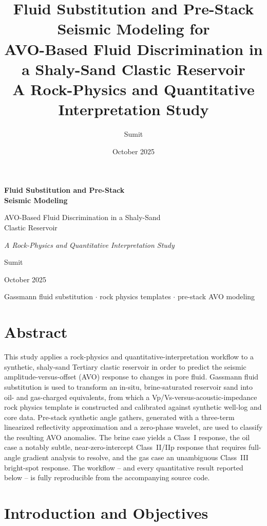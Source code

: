 \documentclass[11pt]{article}
\title{\Large\textbf{Fluid Substitution and Pre-Stack Seismic Modeling for\\
AVO-Based Fluid Discrimination in a Shaly-Sand Clastic Reservoir}\\[6pt]
\large A Rock-Physics and Quantitative Interpretation Study}
\author{Sumit}
\date{October 2025}
\begin{document}
\begin{titlepage}
\centering
\vspace*{2.5cm}
{\Huge\bfseries Fluid Substitution and Pre-Stack\\[4pt] Seismic Modeling\par}
\vspace{0.8cm}
{\Large AVO-Based Fluid Discrimination in a Shaly-Sand\\ Clastic Reservoir\par}
\vspace{1.2cm}
{\large\itshape A Rock-Physics and Quantitative Interpretation Study\par}
\vspace{2.5cm}
{\Large Sumit\par}
\vspace{0.4cm}
{\large October 2025\par}
\vfill
{\small Gassmann fluid substitution \(\cdot\) rock physics templates \(\cdot\) pre-stack AVO modeling\par}
\vspace{1cm}
\end{titlepage}

\section*{Abstract}
This study applies a rock-physics and quantitative-interpretation workflow to a synthetic, shaly-sand Tertiary clastic reservoir in order to predict the seismic amplitude-versus-offset (AVO) response to changes in pore fluid. Gassmann fluid substitution is used to transform an in-situ, brine-saturated reservoir sand into oil- and gas-charged equivalents, from which a Vp/Vs-versus-acoustic-impedance rock physics template is constructed and calibrated against synthetic well-log and core data. Pre-stack synthetic angle gathers, generated with a three-term linearized reflectivity approximation and a zero-phase wavelet, are used to classify the resulting AVO anomalies. The brine case yields a Class~I response, the oil case a notably subtle, near-zero-intercept Class~II/IIp response that requires full-angle gradient analysis to resolve, and the gas case an unambiguous Class~III bright-spot response. The workflow -- and every quantitative result reported below -- is fully reproducible from the accompanying source code.

\tableofcontents
\thispagestyle{empty}
\newpage

\section{Introduction and Objectives}
\end{document}
